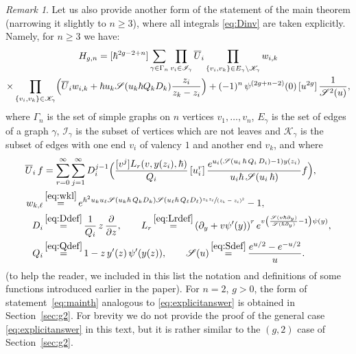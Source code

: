 \documentclass[JEP,XML,SOM,Unicode,NoEqCountersInSection,NoFloatCountersInSection]{cedram}
\let\mathcal\mathscr
\theoremstyle{plain}
\theoremstyle{definition}
\theoremstyle{remark}
\newtheorem{remark}[theorem]{Remark}
\newcommand{\cS}{\mathcal{S}}
\newcommand{\Hc}{H}
\begin{document}
\begin{remark}\label{rem:generalExplicit}
Let us also provide
another
form of the statement of the main theorem (narrowing it slightly to $n\geq 3$),
where all integrals \eqref{eq:Dinv} are taken explicitly.
Namely, for $n\geq 3$ we have:
\begin{multline}
\label{eq:explicitanswer}
\Hc_{g,n}=
[\hbar^{2g-2+n}] \sum\limits_{\gamma\in\Gamma_n} \prod\limits_{v_i\in\mathcal{I}_\gamma} \overline{U}_i \prod\limits_{\{v_i,v_k\}\in E_\gamma\setminus\mathcal K_\gamma}w_{i,k}
\\
\times\prod_{\{v_i,v_k\}\in\mathcal{K}_\gamma}\Bigl(\overline{U}_i w_{i,k} + \hbar u_k \cS(u_k\hbar Q_kD_k)\frac{z_i}{z_k-z_i} \Bigr)
+ (-1)^{n}\,\psi^{(2g+n-2)}(0)\,[u^{2g}]\,\frac1{\cS^2(u)},
\end{multline}
where $\Gamma_n$ is the set of simple graphs on $n$ vertices $v_1,\ldots,v_n$, $E_\gamma$ is the set of edges of a graph $\gamma$, $\mathcal{I}_\gamma$ is the subset of vertices which are not leaves and $\mathcal{K}_\gamma$ is the subset of edges with one end $v_i$ of valency $1$ and another end $v_k$, and where
\begin{align*}
\overline U_i\, f &= \sum_{r=0}^\infty\sum_{j=1}^\infty D_i^{j-1} \Bigl(\frac{[v^j]L_r(v,y(z_i),\hbar)}{Q_i}
\,[u_i^r]\, \frac{e^{u_i(\cS(u_i\,\hbar\,Q_i\,D_i)-1)y(z_i)}}{u_i\hbar\,\cS(u_i\,\hbar)}f \Bigr),\\
w_{k,\ell}&\mathop{=}^{\eqref{eq:wkl}}e^{\hbar^2u_ku_\ell\cS(u_k\hbar\,Q_k D_k)\cS(u_\ell\hbar\,Q_\ell D_\ell)
\sfrac{z_k z_\ell}{(z_k-z_\ell)^2}}-1, \\
D_i &\mathop{=}^{\eqref{eq:Ddef}} \dfrac{1}{Q_i}\,z\, \dfrac{\partial}{\partial z},\qquad
L_r \mathop{=}^{\eqref{eq:Lrdef}} \left(\partial_y+v\psi'(y)\right)^r e^{v\left(\frac{\cS(v\hbar\partial_y)}{\cS(\hbar\partial_y)}-1\right)\psi(y)},\\
Q_i&\mathop{=}^{\eqref{eq:Qdef}} 1-z\,y'(z)\,\psi'(y(z)),\qquad
\mathcal{S}(u)\mathop{=}^{\eqref{eq:Sdef}}\dfrac{e^{u/2}-e^{-u/2}}{u}.
\end{align*}
(to help the reader, we included in this list the notation and definitions of some functions introduced earlier in the paper). For $n=2$, $g>0$, the form of statement~\eqref{eq:mainth} analogous to \eqref{eq:explicitanswer} is obtained in Section~\ref{sec:g2}. For brevity we do not provide the proof of the general case \eqref{eq:explicitanswer} in this text, but it is rather similar to the $(g,2)$ case of Section~\ref{sec:g2}.
\end{remark}
\end{document}

